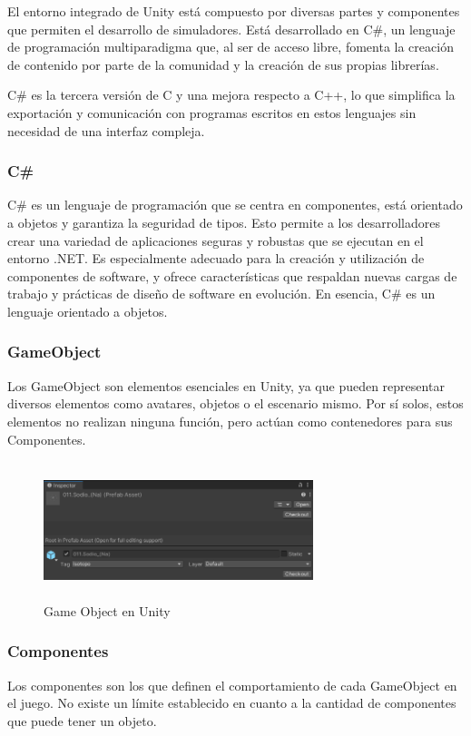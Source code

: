 El entorno integrado de Unity está compuesto por diversas partes y componentes que permiten el desarrollo de simuladores. Está desarrollado en C\#, un lenguaje de programación multiparadigma que, al ser de acceso libre, fomenta la creación de contenido por parte de la comunidad y la creación de sus propias librerías.

C\# es la tercera versión de C y una mejora respecto a C++, lo que simplifica la exportación y comunicación con programas escritos en estos lenguajes sin necesidad de una interfaz compleja.

\subsubsection{C\#}
C\# es un lenguaje de programación que se centra en componentes, está orientado a objetos y garantiza la seguridad de tipos. Esto permite a los desarrolladores crear una variedad de aplicaciones seguras y robustas que se ejecutan en el entorno .NET. Es especialmente adecuado para la creación y utilización de componentes de software, y ofrece características que respaldan nuevas cargas de trabajo y prácticas de diseño de software en evolución. En esencia, C\#  es un lenguaje orientado a objetos.

\subsubsection{GameObject}
Los GameObject son elementos esenciales en Unity, ya que pueden representar diversos elementos como avatares, objetos o el escenario mismo. Por sí solos, estos elementos no realizan ninguna función, pero actúan como contenedores para sus Componentes.

\begin{figure}[thbp]
    \centering
    \includegraphics[width=0.7\textwidth, height = 4cm]{img/chapter03/Game_Object.png}
    \caption{Game Object en Unity}
    \label{fig:game_object}
\end{figure}

\subsubsection{Componentes}
Los componentes son los que definen el comportamiento de cada GameObject en el juego. No existe un límite establecido en cuanto a la cantidad de componentes que puede tener un objeto.

